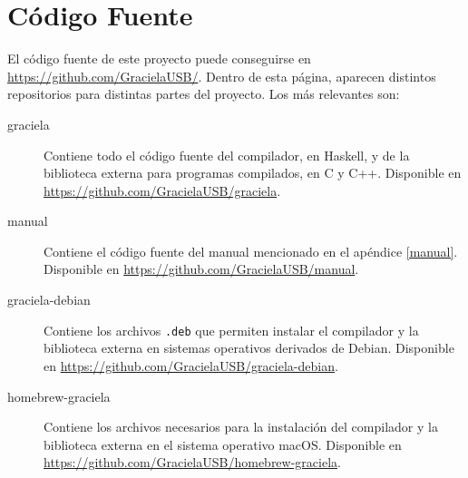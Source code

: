 \chapter{Código Fuente}
\label{source}

El código fuente de este proyecto puede conseguirse en \url{https://github.com/GracielaUSB/}. Dentro de esta página, aparecen distintos repositorios para distintas partes del proyecto. Los más relevantes son:

\begin{description}
  \item[graciela] Contiene todo el código fuente del compilador, en Haskell, y de la biblioteca externa para programas compilados, en C y C++. Disponible en \url{https://github.com/GracielaUSB/graciela}.
  \item[manual] Contiene el código fuente del manual mencionado en el apéndice \ref{manual}. Disponible en \url{https://github.com/GracielaUSB/manual}.
  \item[graciela-debian] Contiene los archivos \texttt{.deb} que permiten instalar el compilador y la biblioteca externa en sistemas operativos derivados de Debian. Disponible en \url{https://github.com/GracielaUSB/graciela-debian}.
  \item[homebrew-graciela] Contiene los archivos necesarios para la instalación del compilador y la biblioteca externa en el sistema operativo macOS. Disponible en \url{https://github.com/GracielaUSB/homebrew-graciela}.
\end{description}
